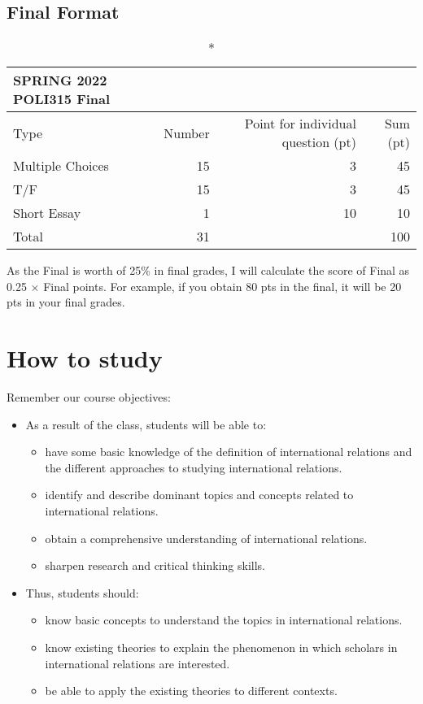 \documentclass[
]{book}
\begin{document}
\hypertarget{final-format}{%
\subsection*{Final Format}\label{final-format}}

\captionsetup[table]{labelformat=empty,skip=1pt}
\begin{longtable}{lrrr}
\caption*{
{\large SPRING 2022 POLI315 Final}
} \\ 
\toprule
Type & Number & Point for individual question (pt) & Sum (pt) \\ 
\midrule
Multiple Choices & 15 & 3 & 45 \\ 
T/F & 15 & 3 & 45 \\ 
Short Essay & 1 & 10 & 10 \\ 
Total & 31 &  & 100 \\ 
 \bottomrule
\end{longtable}

As the Final is worth of 25\% in final grades, I will calculate the score of Final as 0.25 \(\times\) Final points. For example, if you obtain 80 pts in the final, it will be 20 pts in your final grades.

\hypertarget{how-to-study}{%
\section*{How to study}\label{how-to-study}}

Remember our course objectives:

\begin{itemize}
\item
  As a result of the class, students will be able to:

  \begin{itemize}
  \item
    have some basic knowledge of the definition of international relations and the different approaches to studying international relations.
  \item
    identify and describe dominant topics and concepts related to international relations.
  \item
    obtain a comprehensive understanding of international relations.
  \item
    sharpen research and critical thinking skills.
  \end{itemize}
\item
  Thus, students should:

  \begin{itemize}
  \item
    know basic concepts to understand the topics in international relations.
  \item
    know existing theories to explain the phenomenon in which scholars in international relations are interested.
  \item
    be able to apply the existing theories to different contexts.
  \end{itemize}
\end{itemize}
\end{document}
